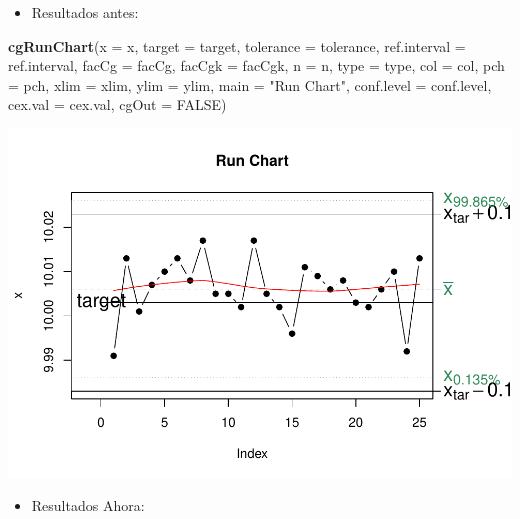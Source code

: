 \documentclass[
]{book}
\newenvironment{Shaded}{\begin{snugshade}}{\end{snugshade}}
\newcommand{\AttributeTok}[1]{\textcolor[rgb]{0.13,0.29,0.53}{#1}}
\newcommand{\ConstantTok}[1]{\textcolor[rgb]{0.56,0.35,0.01}{#1}}
\newcommand{\FunctionTok}[1]{\textcolor[rgb]{0.13,0.29,0.53}{\textbf{#1}}}
\newcommand{\NormalTok}[1]{#1}
\newcommand{\StringTok}[1]{\textcolor[rgb]{0.31,0.60,0.02}{#1}}
\providecommand{\tightlist}{%
  \setlength{\itemsep}{0pt}\setlength{\parskip}{0pt}}
\begin{document}
\begin{itemize}
\tightlist
\item
  Resultados antes:
\end{itemize}

\begin{Shaded}
\begin{Highlighting}[]
\FunctionTok{cgRunChart}\NormalTok{(}\AttributeTok{x =}\NormalTok{ x, }\AttributeTok{target =}\NormalTok{ target, }\AttributeTok{tolerance =}\NormalTok{ tolerance, }
           \AttributeTok{ref.interval =}\NormalTok{ ref.interval, }\AttributeTok{facCg =}\NormalTok{ facCg, }\AttributeTok{facCgk =}\NormalTok{ facCgk, }
           \AttributeTok{n =}\NormalTok{ n, }\AttributeTok{type =}\NormalTok{ type, }\AttributeTok{col =}\NormalTok{ col, }\AttributeTok{pch =}\NormalTok{ pch, }\AttributeTok{xlim =}\NormalTok{ xlim, }
           \AttributeTok{ylim =}\NormalTok{ ylim, }\AttributeTok{main =} \StringTok{"Run Chart"}\NormalTok{, }\AttributeTok{conf.level =}\NormalTok{ conf.level, }
           \AttributeTok{cex.val =}\NormalTok{ cex.val, }\AttributeTok{cgOut =} \ConstantTok{FALSE}\NormalTok{)}
\end{Highlighting}
\end{Shaded}

\includegraphics{Libro_TidyQualityTools_files/figure-latex/unnamed-chunk-143-1.pdf}

\begin{itemize}
\tightlist
\item
  Resultados Ahora:
\end{itemize}
\end{document}
